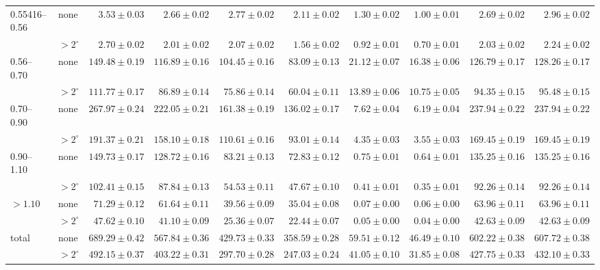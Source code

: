 \begin{table}[H]
{\begin{tabular}{llrrrrrrrr}
0.55416--0.56 & none & $3.53\pm0.03$ & $2.66\pm0.02$ & $2.77\pm0.02$ & $2.11\pm0.02$ & $1.30\pm0.02$ & $1.00\pm0.01$ & $2.69\pm0.02$ & $2.96\pm0.02$ \\
 & $>2^\circ$ & $2.70\pm0.02$ & $2.01\pm0.02$ & $2.07\pm0.02$ & $1.56\pm0.02$ & $0.92\pm0.01$ & $0.70\pm0.01$ & $2.03\pm0.02$ & $2.24\pm0.02$ \\
0.56--0.70 & none & $149.48\pm0.19$ & $116.89\pm0.16$ & $104.45\pm0.16$ & $83.09\pm0.13$ & $21.12\pm0.07$ & $16.38\pm0.06$ & $126.79\pm0.17$ & $128.26\pm0.17$ \\
 & $>2^\circ$ & $111.77\pm0.17$ & $86.89\pm0.14$ & $75.86\pm0.14$ & $60.04\pm0.11$ & $13.89\pm0.06$ & $10.75\pm0.05$ & $94.35\pm0.15$ & $95.48\pm0.15$ \\
0.70--0.90 & none & $267.97\pm0.24$ & $222.05\pm0.21$ & $161.38\pm0.19$ & $136.02\pm0.17$ & $7.62\pm0.04$ & $6.19\pm0.04$ & $237.94\pm0.22$ & $237.94\pm0.22$ \\
 & $>2^\circ$ & $191.37\pm0.21$ & $158.10\pm0.18$ & $110.61\pm0.16$ & $93.01\pm0.14$ & $4.35\pm0.03$ & $3.55\pm0.03$ & $169.45\pm0.19$ & $169.45\pm0.19$ \\
0.90--1.10 & none & $149.73\pm0.17$ & $128.72\pm0.16$ & $83.21\pm0.13$ & $72.83\pm0.12$ & $0.75\pm0.01$ & $0.64\pm0.01$ & $135.25\pm0.16$ & $135.25\pm0.16$ \\
 & $>2^\circ$ & $102.41\pm0.15$ & $87.84\pm0.13$ & $54.53\pm0.11$ & $47.67\pm0.10$ & $0.41\pm0.01$ & $0.35\pm0.01$ & $92.26\pm0.14$ & $92.26\pm0.14$ \\
$>1.10$ & none & $71.29\pm0.12$ & $61.64\pm0.11$ & $39.56\pm0.09$ & $35.04\pm0.08$ & $0.07\pm0.00$ & $0.06\pm0.00$ & $63.96\pm0.11$ & $63.96\pm0.11$ \\
 & $>2^\circ$ & $47.62\pm0.10$ & $41.10\pm0.09$ & $25.36\pm0.07$ & $22.44\pm0.07$ & $0.05\pm0.00$ & $0.04\pm0.00$ & $42.63\pm0.09$ & $42.63\pm0.09$ \\
total & none & $689.29\pm0.42$ & $567.84\pm0.36$ & $429.73\pm0.33$ & $358.59\pm0.28$ & $59.51\pm0.12$ & $46.49\pm0.10$ & $602.22\pm0.38$ & $607.72\pm0.38$ \\
 & $>2^\circ$ & $492.15\pm0.37$ & $403.22\pm0.31$ & $297.70\pm0.28$ & $247.03\pm0.24$ & $41.05\pm0.10$ & $31.85\pm0.08$ & $427.75\pm0.33$ & $432.10\pm0.33$ \\
\bottomrule
\end{tabular}}
\end{table}

